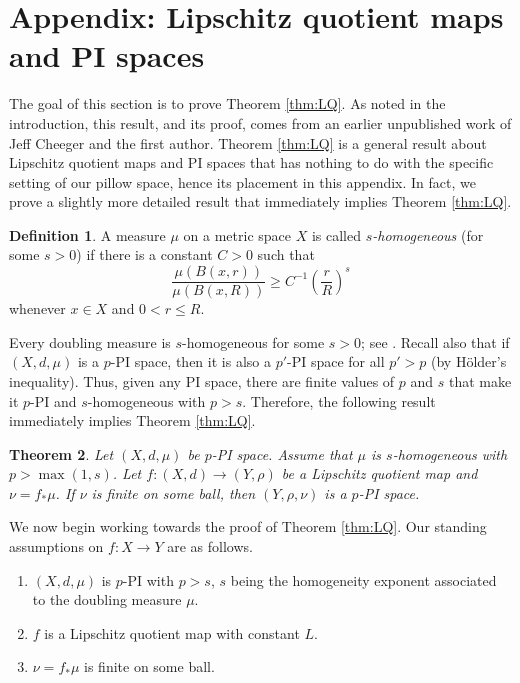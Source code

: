 \documentclass{amsart}
\theoremstyle{plain}
\newtheorem{theorem}{Theorem}
\theoremstyle{definition}
\newtheorem{definition}[theorem]{Definition}
\numberwithin{equation}{section}
\numberwithin{theorem}{section}
\begin{document}
\section*{Appendix: Lipschitz quotient maps and PI spaces}




The goal of this section is to prove Theorem \ref{thm:LQ}. As noted in the introduction, this result, and its proof, comes from an earlier unpublished work of Jeff Cheeger and the first author.  Theorem \ref{thm:LQ} is a general result about Lipschitz quotient maps and PI spaces that has nothing to do with the specific setting of our pillow space, hence its placement in this appendix. In fact, we prove a slightly more detailed result that immediately implies Theorem \ref{thm:LQ}.

\begin{definition}
A measure $\mu$ on a metric space $X$ is called \emph{$s$-homogeneous} (for some $s>0$) if there is a constant $C>0$ such that
$$ \frac{\mu(B(x,r))}{\mu(B(x,R))} \geq C^{-1} \left(\frac{r}{R}\right)^s$$
whenever $x\in X$ and $0<r\leq R$.
\end{definition}
Every doubling measure is $s$-homogeneous for some $s>0$; see \cite[p. 103-104]{He}. Recall also that if $(X,d,\mu)$ is a $p$-PI space, then it is also a $p'$-PI space for all $p'>p$ (by H\"older's inequality). Thus, given any PI space, there are finite values of $p$ and $s$ that make it $p$-PI and $s$-homogeneous with $p>s$. Therefore, the following result immediately implies Theorem \ref{thm:LQ}.

\begin{theorem}\label{thm:LQ2}
Let $(X,d,\mu)$ be $p$-PI space. Assume that $\mu$ is $s$-homogeneous with $p>\max(1,s)$. Let $f\colon (X,d)\rightarrow (Y,\rho)$ be a Lipschitz quotient map and $\nu = f_{*}\mu$. If $\nu$ is finite on some ball, then $(Y,\rho,\nu)$  is a $p$-PI space.
\end{theorem}


We now begin working towards the proof of Theorem \ref{thm:LQ}. Our standing assumptions on $f:X\rightarrow Y$ are as follows.
\begin{enumerate}
\item $(X,d,\mu)$ is $p$-PI with $p>s$, $s$ being the homogeneity exponent associated to the doubling measure $\mu$. 
\item $f$ is a Lipschitz quotient map with constant $L$.
\item $\nu=f_* \mu$ is finite on some ball.
\end{enumerate}
\end{document}
